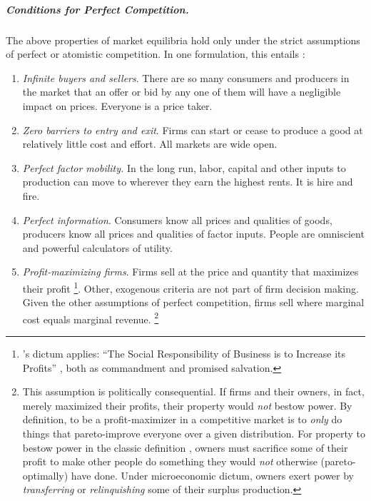 \subparagraph[Perfect Competition]{Conditions for Perfect Competition.} \label{sec:perfect-competition} 
The above properties of market equilibria hold only under the strict assumptions of perfect or atomistic competition. 
In one formulation, this entails \citep[157f.]{McDowell2006}: 
\begin{enumerate}
	\item \emph{Infinite buyers and sellers}. \label{itm:infinite-buyers-sellers} 
		There are so many consumers and producers in the market that an offer or bid by any one of them will have a negligible impact on prices. 
		Everyone is a price taker.
	\item \emph{Zero barriers to entry and exit}. \label{itm:easy-entry-exit}
	 	Firms can start or cease to produce a good at relatively little cost and effort. 
	 	All markets are wide open. 
	\item \emph{Perfect factor mobility.} \label{itm:perfect-factor-mobility} 
		In the long run, labor, capital and other inputs to production can move to wherever they earn the highest rents. 
		It is hire and fire.
	\item \emph{Perfect information}. \label{itm:perfect-information} 
		Consumers know all prices and qualities of goods, producers know all prices and qualities of factor inputs. 
		People are omniscient and powerful calculators of utility.
	\item \emph{Profit-maximizing firms}. \label{itm:profit-maximizing-firms} 
		Firms sell at the price and quantity that maximizes their profit
		\footnote{
			\citeauthor{Friedman1970a}'s dictum applies: ``The Social Responsibility of Business is to Increase its Profits'' \citeyearpar{Friedman1970a}, both as commandment and promised salvation.
		}.
		Other, exogenous criteria are not part of firm decision making. Given the other assumptions of perfect competition, firms sell where marginal cost equals marginal revenue.
		\footnote{
			This assumption is politically consequential.
			If firms and their owners, in fact, merely maximized their profits, their property would \emph{not} bestow power.
			By definition, to be a profit-maximizer in a competitive market is to \emph{only} do things that pareto-improve everyone over a given distribution. 
			For property to bestow power in the classic definition \citep[8ff]{Geoff2002}, owners must sacrifice some of their profit to make other people do something they would \emph{not} otherwise (pareto-optimally) have done.
			Under microeconomic dictum, owners exert power by \emph{transferring} or \emph{relinquishing} some of their surplus production.
			
}
\end{enumerate}
